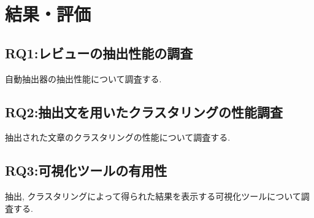 \chapter{結果・評価}
\label{chap:kekkahyouka}

\section{RQ1:レビューの抽出性能の調査}
自動抽出器の抽出性能について調査する. 


\section{RQ2:抽出文を用いたクラスタリングの性能調査}
抽出された文章のクラスタリングの性能について調査する. 


\section{RQ3:可視化ツールの有用性}
抽出, クラスタリングによって得られた結果を表示する可視化ツールについて調査する. 